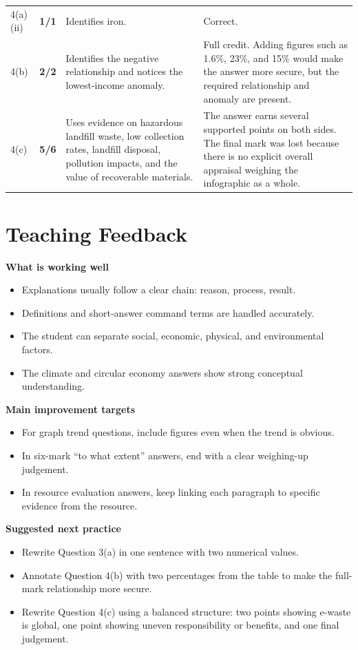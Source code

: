 \documentclass[11pt]{article}
\newcommand{\markcell}[2]{\textbf{#1/#2}}
\begin{document}
\begin{longtable}{@{}p{} p{} p{} p{}@{}}
4(a)(ii) & \markcell{1}{1} & Identifies iron. & Correct. \\
4(b) & \markcell{2}{2} & Identifies the negative relationship and notices the lowest-income anomaly. & Full credit. Adding figures such as 1.6\%, 23\%, and 15\% would make the answer more secure, but the required relationship and anomaly are present. \\
4(c) & \markcell{5}{6} & Uses evidence on hazardous landfill waste, low collection rates, landfill disposal, pollution impacts, and the value of recoverable materials. & The answer earns several supported points on both sides. The final mark was lost because there is no explicit overall appraisal weighing the infographic as a whole. \\
\bottomrule
\end{longtable}

\section*{Teaching Feedback}

\textbf{What is working well}
\begin{itemize}
  \item Explanations usually follow a clear chain: reason, process, result.
  \item Definitions and short-answer command terms are handled accurately.
  \item The student can separate social, economic, physical, and environmental factors.
  \item The climate and circular economy answers show strong conceptual understanding.
\end{itemize}

\textbf{Main improvement targets}
\begin{itemize}
  \item For graph trend questions, include figures even when the trend is obvious.
  \item In six-mark ``to what extent'' answers, end with a clear weighing-up judgement.
  \item In resource evaluation answers, keep linking each paragraph to specific evidence from the resource.
\end{itemize}

\textbf{Suggested next practice}
\begin{itemize}
  \item Rewrite Question 3(a) in one sentence with two numerical values.
  \item Annotate Question 4(b) with two percentages from the table to make the full-mark relationship more secure.
  \item Rewrite Question 4(c) using a balanced structure: two points showing e-waste is global, one point showing uneven responsibility or benefits, and one final judgement.
\end{itemize}
\end{document}

